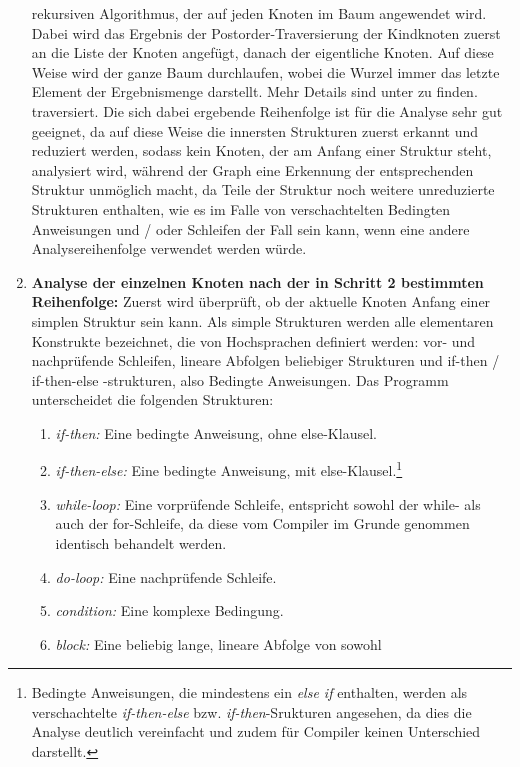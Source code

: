 \documentclass[11pt]{article}
\begin{document}
\begin{enumerate}
{			rekursiven Algorithmus, der auf jeden Knoten im Baum angewendet
			wird. Dabei wird das Ergebnis der Postorder-Traversierung der Kindknoten
			zuerst an die Liste der Knoten angefügt, danach der eigentliche Knoten. Auf
			diese Weise wird der ganze Baum durchlaufen, wobei die Wurzel immer das
			letzte Element der Ergebnismenge darstellt. Mehr Details sind unter
			\cite{wiki3:6} zu finden.
		}
		traversiert. Die sich dabei ergebende Reihenfolge ist
		für die Analyse sehr gut geeignet, da auf diese Weise die innersten Strukturen
		zuerst erkannt und reduziert werden, sodass kein Knoten, der am Anfang einer
		Struktur steht, analysiert wird, während der Graph eine Erkennung der entsprechenden
		Struktur unmöglich macht, da Teile der Struktur noch weitere unreduzierte Strukturen
		enthalten, wie es im Falle von verschachtelten Bedingten Anweisungen und / oder Schleifen
		der Fall sein kann, wenn eine andere Analysereihenfolge verwendet werden würde.
	\item{\textbf{Analyse der einzelnen Knoten nach der in Schritt 2 bestimmten Reihenfolge:}}
		Zuerst wird überprüft, ob der aktuelle Knoten Anfang einer simplen
		Struktur sein kann. Als simple Strukturen werden alle elementaren
		Konstrukte bezeichnet, die von Hochsprachen definiert werden: vor-
		und nachprüfende Schleifen, lineare Abfolgen beliebiger Strukturen
		und if-then / if-then-else -strukturen, also Bedingte Anweisungen.
		Das Programm unterscheidet die folgenden Strukturen:
		\begin{enumerate}
			\item{\textit{if-then:}}
				Eine bedingte Anweisung, ohne else-Klausel.
			\item{\textit{if-then-else:}}
				Eine bedingte Anweisung, mit else-Klausel.\footnote{
					Bedingte Anweisungen, die mindestens ein \textit{else if}
					enthalten, werden als verschachtelte \textit{if-then-else}
					bzw. \textit{if-then}-Srukturen angesehen, da dies die
					Analyse deutlich vereinfacht und zudem für Compiler
					keinen Unterschied darstellt.
				}
			\item{\textit{while-loop:}}
				Eine vorprüfende Schleife, entspricht sowohl der
				while- als auch der for-Schleife, da diese vom
                Compiler im Grunde genommen identisch behandelt werden.
			\item{\textit{do-loop:}}
				Eine nachprüfende Schleife.
			\item{\textit{condition:}}
				Eine komplexe Bedingung.
			\item{\textit{block:}}
				Eine beliebig lange, lineare Abfolge von sowohl

\end{enumerate}
\end{enumerate}
\end{document}
